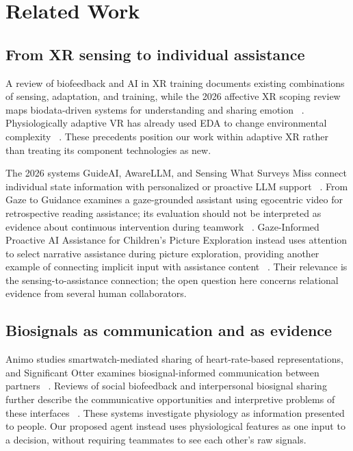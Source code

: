 \section{Related Work}
\label{sec:2}

\subsection{From XR sensing to individual assistance}

A review of biofeedback and AI in XR training documents existing combinations of sensing, adaptation, and training, while the 2026 affective XR scoping review maps biodata-driven systems for understanding and sharing emotion ~\cite{p6,p37}. Physiologically adaptive VR has already used EDA to change environmental complexity ~\cite{p11}. These precedents position our work within adaptive XR rather than treating its component technologies as new.

The 2026 systems GuideAI, AwareLLM, and Sensing What Surveys Miss connect individual state information with personalized or proactive LLM support ~\cite{guide,aware,sensing}. From Gaze to Guidance examines a gaze-grounded assistant using egocentric video for retrospective reading assistance; its evaluation should not be interpreted as evidence about continuous intervention during teamwork ~\cite{gaze}. Gaze-Informed Proactive AI Assistance for Children's Picture Exploration instead uses attention to select narrative assistance during picture exploration, providing another example of connecting implicit input with assistance content ~\cite{children}. Their relevance is the sensing-to-assistance connection; the open question here concerns relational evidence from several human collaborators.

\subsection{Biosignals as communication and as evidence}

Animo studies smartwatch-mediated sharing of heart-rate-based representations, and Significant Otter examines biosignal-informed communication between partners ~\cite{p38,p39}. Reviews of social biofeedback and interpersonal biosignal sharing further describe the communicative opportunities and interpretive problems of these interfaces ~\cite{p46,p21}. These systems investigate physiology as information presented to people. Our proposed agent instead uses physiological features as one input to a decision, without requiring teammates to see each other's raw signals.

